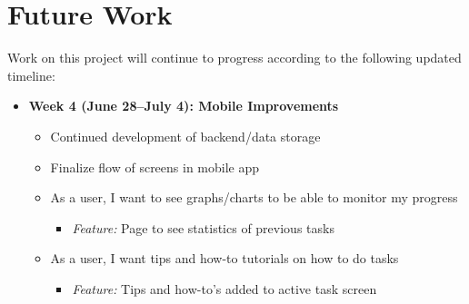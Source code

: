 \documentclass{sigchi}
\begin{document}
\section{Future Work}

Work on this project will continue to progress according to the following
updated timeline:

\newenvironment{myitemize}
{ \begin{itemize}
    \setlength{\itemsep}{0pt}
    \setlength{\parskip}{0pt}
    \setlength{\parsep}{0pt}     }
{ \end{itemize}                  } 

\begin{myitemize}
  \setlength{\itemsep}{0pt}
  \setlength{\parskip}{0pt}
  \setlength{\parsep}{0pt}
	\item \textbf{Week 4 (June 28--July 4): Mobile Improvements}
	\begin{myitemize}
		\item Continued development of backend/data storage
		\item Finalize flow of screens in mobile app
		\item As a user, I want to see graphs/charts to be able to monitor my progress
		\begin{myitemize}
			\item \textit{Feature:} Page to see statistics of previous tasks
		\end{myitemize}
		\item As a user, I want tips and how-to tutorials on how to do tasks
		\begin{myitemize}
			\item \textit{Feature:} Tips and how-to’s added to active task screen
		\end{myitemize}
	\end{myitemize}
  

\end{myitemize}
\end{document}
